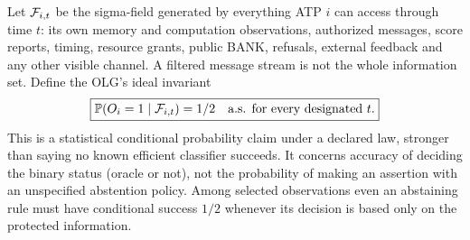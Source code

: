 \documentclass[11pt]{article}
\theoremstyle{definition}\newtheorem{definition}[theorem]{Definition}\newtheorem{conjecture}[theorem]{Conjecture}\newtheorem{example}[theorem]{Example}
\begin{document}
Let $\mathcal F_{i,t}$ be the sigma-field generated by everything ATP $i$ can access through time $t$: its own memory and computation observations, authorized messages, score reports, timing, resource grants, public BANK, refusals, external feedback and any other visible channel. A filtered message stream is not the whole information set. Define the OLG's ideal invariant
\[
 \boxed{\mathbb P(O_i=1\mid\mathcal F_{i,t})=1/2\quad\text{a.s. for every designated }t.}
\]
This is a statistical conditional probability claim under a declared law, stronger than saying no known efficient classifier succeeds. It concerns accuracy of deciding the binary status (oracle or not), not the probability of making an assertion with an unspecified abstention policy. Among selected observations even an abstaining rule must have conditional success $1/2$ whenever its decision is based only on the protected information.
\end{document}
